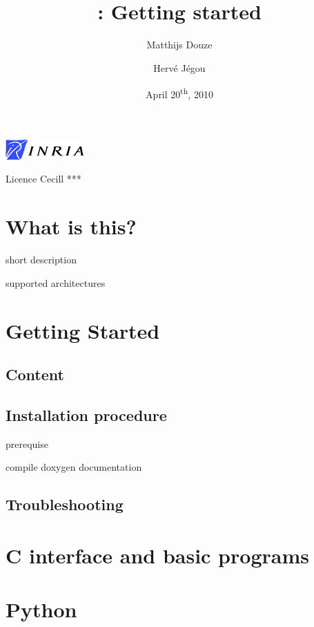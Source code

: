 \documentclass[a4paper,11pt,notitlepage,final,twoside]{report}
\title{~\vspace{9cm} \\ \yael: Getting started}
\author{Matthijs Douze \and Herv\'e J\'egou}
\date{April 20\textsuperscript{th}, 2010}
\begin{document}
\maketitle
\thispagestyle{empty}

\vfill

\includegraphics[width=3cm]{./figs/logoinria}


\newpage
Licence Cecill ***


\tableofcontents            %


\chapter{What is this?}

short description

supported architectures



\chapter{Getting Started}

\section{Content}


\section{Installation procedure}

prerequise


compile doxygen documentation


\section{Troubleshooting}



\chapter{C interface and basic programs}

\chapter{Python}
\end{document}
